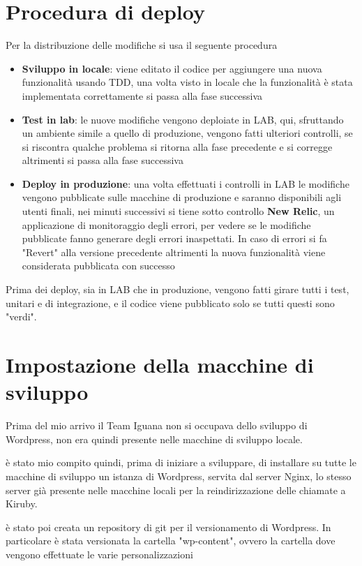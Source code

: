 \section{Procedura di deploy}
Per la distribuzione delle modifiche si usa il seguente procedura
\begin{itemize}
\item {\bf Sviluppo in locale}: viene editato il codice per aggiungere una nuova funzionalità usando
TDD, una volta visto in locale che la funzionalità è stata implementata correttamente si passa alla fase successiva
\item {\bf Test in lab}: le nuove modifiche vengono deploiate in LAB, qui, sfruttando un ambiente simile a quello di 
produzione, vengono fatti ulteriori controlli, se si riscontra qualche problema si ritorna alla fase precedente e si corregge
altrimenti si passa alla fase successiva 
\item {\bf Deploy in produzione}: una volta effettuati i controlli in LAB le modifiche vengono pubblicate sulle macchine
di produzione e saranno disponibili agli utenti finali, nei minuti successivi si tiene sotto controllo {\bf New Relic}, un
applicazione di monitoraggio degli errori, per vedere se le modifiche pubblicate fanno generare degli errori inaspettati.
In caso di errori si fa "Revert" alla versione precedente altrimenti la nuova funzionalità viene considerata pubblicata con successo
\end{itemize}

Prima dei deploy, sia in LAB che in produzione, vengono fatti girare tutti i test, unitari e di integrazione, e il codice viene pubblicato solo se tutti questi sono "verdi".

\section{Impostazione della macchine di sviluppo}

Prima del mio arrivo il Team Iguana non si occupava dello sviluppo di Wordpress, non era quindi presente
nelle macchine di sviluppo locale.

è stato mio compito quindi, prima di iniziare a sviluppare, di installare su tutte le macchine di sviluppo
un istanza di Wordpress, servita dal server Nginx, lo stesso server già presente nelle macchine locali per
la reindirizzazione delle chiamate a Kiruby.

è stato poi creata un repository di git per il versionamento di Wordpress. In particolare è stata versionata
la cartella "wp-content", ovvero la cartella dove vengono effettuate le varie personalizzazioni

